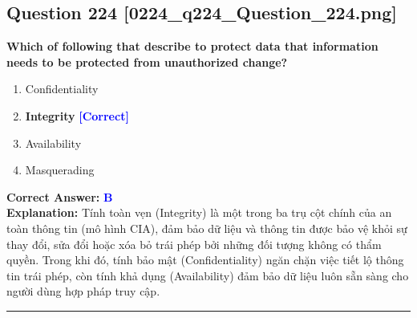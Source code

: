 \documentclass[11pt,a4paper]{article}
\begin{document}
\begin{minipage}{\textwidth}
\subsection*{Question 224 \quad \footnotesize{[0224\_q224\_Question\_224.png]}}
\noindent \textbf{Which of following that describe to protect data that information needs to be protected from unauthorized change?}

\begin{enumerate}[label=\Alph*.]
    \item Confidentiality
    \item \textbf{Integrity} \hfill \textcolor{blue}{\textbf{[Correct]}}
    \item Availability
    \item Masquerading
\end{enumerate}

\noindent \textbf{Correct Answer:} \textcolor{blue}{\textbf{B}} \\[2pt]
\noindent \textbf{Explanation:} Tính toàn vẹn (Integrity) là một trong ba trụ cột chính của an toàn thông tin (mô hình CIA), đảm bảo dữ liệu và thông tin được bảo vệ khỏi sự thay đổi, sửa đổi hoặc xóa bỏ trái phép bởi những đối tượng không có thẩm quyền. Trong khi đó, tính bảo mật (Confidentiality) ngăn chặn việc tiết lộ thông tin trái phép, còn tính khả dụng (Availability) đảm bảo dữ liệu luôn sẵn sàng cho người dùng hợp pháp truy cập.

\par\vspace{0.3cm}
\hrule
\vspace{0.3cm}
\end{minipage}
\end{document}
